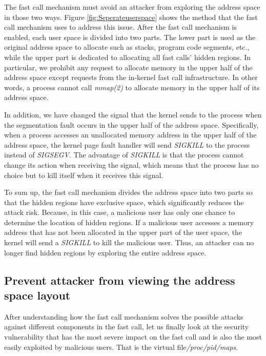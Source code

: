 The fast call mechanism must avoid an attacker from exploring 
the address space in those two ways. Figure \ref{fig:Seperateuserspace} 
shows the method that the fast call mechanism uses to address this issue. 
After the fast call mechanism is enabled, each user space is divided into
two parts. The lower part is used as the original address space to 
allocate such as stacks, program code segments, etc., while the upper 
part is dedicated to allocating all fast calls' hidden regions. 
In particular, we prohibit any request to allocate memory in the 
upper half of the address space except requests from the in-kernel 
fast call infrastructure. In other words, a process cannot call \emph{mmap(2)} 
to allocate memory in the upper half of its address space.

In addition, we have changed the signal that the kernel 
sends to the process when the segmentation fault occurs 
in the upper half of the address space. Specifically, 
when a process accesses an unallocated memory address 
in the upper half of the address space, the kernel page 
fault handler will send \emph{SIGKILL}\cite{21} to the process instead 
of \emph{SIGSEGV}. The advantage of \emph{SIGKILL} is that the process 
cannot change its action when receiving the signal, which means 
that the process has no choice but to kill itself 
when it receives this signal.

To sum up, the fast call mechanism divides the address space 
into two parts so that the hidden regions have exclusive space,
which significantly reduces the attack risk. Because, in this 
case, a malicious user has only one chance to determine the 
location of hidden regions.  If a malicious user accesses a 
memory address that has not been allocated in the upper part
of the user space, the kernel will send a \emph{SIGKILL} to kill 
the malicious user. Thus, an attacker can no longer find hidden 
regions by exploring the entire address space.


\subsection{Prevent attacker from viewing the address space layout}

After understanding how the fast call mechanism solves the possible attacks 
against different components in the fast call, let us finally look at the security 
vulnerability that has the most severe impact on the fast call and is also the most 
easily exploited by malicious users. That is the virtual file\emph{/proc/pid/maps}\cite{23}. 

